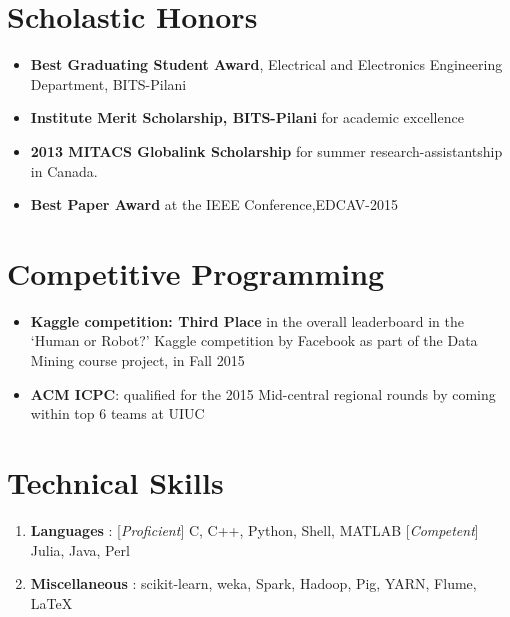 \documentclass[resmargin,line]{res}
\begin{document}
\renewcommand\labelitemi{{\boldmath$\cdot$}}

\section{\sc Scholastic Honors}
\begin{itemize}[leftmargin=0.12cm, itemsep=0pt]
\item[] \textbf{Best Graduating Student Award}, Electrical and Electronics Engineering Department, BITS-Pilani
\item[] \textbf{Institute Merit Scholarship, BITS-Pilani} for academic excellence
\item[] \textbf{2013 MITACS Globalink Scholarship} for summer research-assistantship in Canada.
\item[] \textbf{Best Paper Award} at the IEEE Conference,EDCAV-2015
\end{itemize}



\renewcommand\labelitemi{{\boldmath$\cdot$}}
\section{\sc Competitive Programming}
\begin{itemize}[leftmargin=0.12cm, itemsep=0pt]
\item[] \textbf{Kaggle competition: Third Place} in the overall leaderboard in the `Human or Robot?' Kaggle competition by Facebook as part of the Data Mining course project, in Fall 2015
\item[] \textbf{ACM ICPC}: qualified for the 2015 Mid-central regional rounds by coming within top 6 teams at UIUC
\end{itemize}

\section{\sc Technical Skills}
\begin{enumerate}[leftmargin=0.12cm, noitemsep]
\item[] \textbf{Languages} : [\textit{Proficient}] C, C++, Python, Shell, MATLAB  \hfill [\textit{Competent}] Julia, Java, Perl
\item[] \textbf{Miscellaneous} : scikit-learn, weka, Spark, Hadoop, Pig, YARN, Flume, \LaTeX
\end{enumerate}
\end{document}
